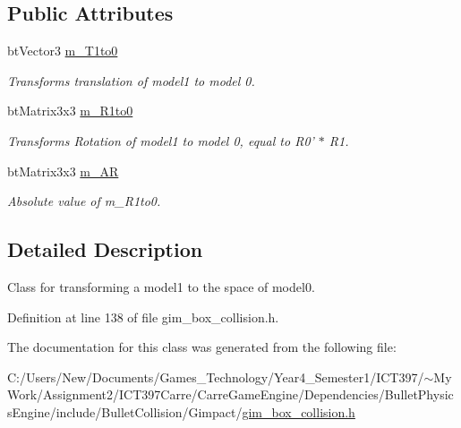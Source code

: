 \subsection*{Public Attributes}
\begin{CompactItemize}
\item 
\hypertarget{class_g_i_m___b_o_x___b_o_x___t_r_a_n_s_f_o_r_m___c_a_c_h_e_f6aacf8817de360554f57799db41c8b4}{
btVector3 \hyperlink{class_g_i_m___b_o_x___b_o_x___t_r_a_n_s_f_o_r_m___c_a_c_h_e_f6aacf8817de360554f57799db41c8b4}{m\_\-T1to0}}
\label{class_g_i_m___b_o_x___b_o_x___t_r_a_n_s_f_o_r_m___c_a_c_h_e_f6aacf8817de360554f57799db41c8b4}

\begin{CompactList}\small\item\em Transforms translation of model1 to model 0. \item\end{CompactList}\item 
\hypertarget{class_g_i_m___b_o_x___b_o_x___t_r_a_n_s_f_o_r_m___c_a_c_h_e_97597f0d242e71eb8ad458838428aa09}{
btMatrix3x3 \hyperlink{class_g_i_m___b_o_x___b_o_x___t_r_a_n_s_f_o_r_m___c_a_c_h_e_97597f0d242e71eb8ad458838428aa09}{m\_\-R1to0}}
\label{class_g_i_m___b_o_x___b_o_x___t_r_a_n_s_f_o_r_m___c_a_c_h_e_97597f0d242e71eb8ad458838428aa09}

\begin{CompactList}\small\item\em Transforms Rotation of model1 to model 0, equal to R0' $\ast$ R1. \item\end{CompactList}\item 
\hypertarget{class_g_i_m___b_o_x___b_o_x___t_r_a_n_s_f_o_r_m___c_a_c_h_e_c6241a28e1c1c1e4a581ba547e30409e}{
btMatrix3x3 \hyperlink{class_g_i_m___b_o_x___b_o_x___t_r_a_n_s_f_o_r_m___c_a_c_h_e_c6241a28e1c1c1e4a581ba547e30409e}{m\_\-AR}}
\label{class_g_i_m___b_o_x___b_o_x___t_r_a_n_s_f_o_r_m___c_a_c_h_e_c6241a28e1c1c1e4a581ba547e30409e}

\begin{CompactList}\small\item\em Absolute value of m\_\-R1to0. \item\end{CompactList}\end{CompactItemize}


\subsection{Detailed Description}
Class for transforming a model1 to the space of model0. 

Definition at line 138 of file gim\_\-box\_\-collision.h.

The documentation for this class was generated from the following file:\begin{CompactItemize}
\item 
C:/Users/New/Documents/Games\_\-Technology/Year4\_\-Semester1/ICT397/$\sim$My Work/Assignment2/ICT397Carre/CarreGameEngine/Dependencies/BulletPhysicsEngine/include/BulletCollision/Gimpact/\hyperlink{gim__box__collision_8h}{gim\_\-box\_\-collision.h}\end{CompactItemize}
